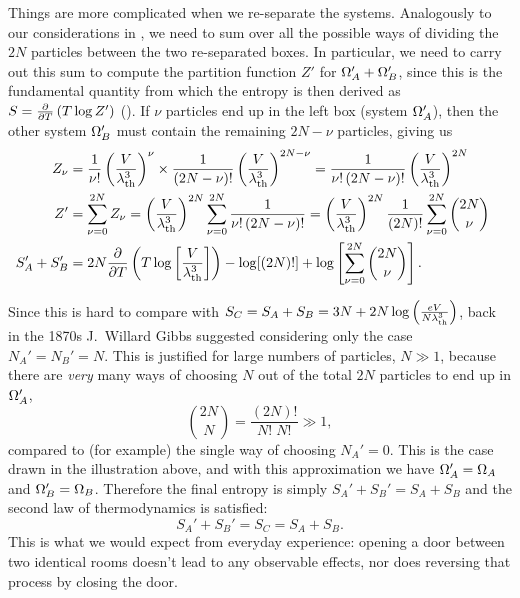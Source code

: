 Things are more complicated when we re-separate the systems.
Analogously to our considerations in , we need to sum over all the possible ways of dividing the $2N$ particles between the two re-separated boxes.
In particular, we need to carry out this sum to compute the partition function $Z'$ for $\Omega_A' + \Omega_B'$, since this is the fundamental quantity from which the entropy is then derived as $S = \frac{\partial }{\partial T}\left(T\log Z'\right)$ ().
If $\nu$ particles end up in the left box (system $\Omega_A'$), then the other system $\Omega_B'$ must contain the remaining $2N - \nu$ particles, giving us
\begin{align}
  Z_{\nu}     & = \frac{1}{\nu!} \left(\frac{V}{\lambda_{\mathrm{th}}^3}\right)^{\nu} \times \frac{1}{(2N - \nu)!} \left(\frac{V}{\lambda_{\mathrm{th}}^3}\right)^{2N - \nu} = \frac{1}{\nu! \, (2N - \nu)!} \left(\frac{V}{\lambda_{\mathrm{th}}^3}\right)^{2N} \cr
  Z'          & = \sum_{\nu = 0}^{2N} Z_{\nu} = \left(\frac{V}{\lambda_{\mathrm{th}}^3}\right)^{2N} \sum_{\nu = 0}^{2N} \frac{1}{\nu! \, (2N - \nu)!} = \left(\frac{V}{\lambda_{\mathrm{th}}^3}\right)^{2N} \frac{1}{(2N)!} \sum_{\nu = 0}^{2N} \binom{2N}{\nu} \cr
  S_A' + S_B' & = 2N \frac{\partial }{\partial T}\left(T\log \left[\frac{V}{\lambda_{\mathrm{th}}^3}\right]\right) - \log[(2N)!] + \log\left[ \sum_{\nu = 0}^{2N} \binom{2N}{\nu} \right]. \label{eq:mixing_full}
\end{align}

Since this is hard to compare with $S_C = S_A + S_B = 3N + 2N \log\left(\frac{eV}{N\lambda_{\mathrm{th}}^3}\right)$, back in the 1870s J.\ Willard Gibbs suggested considering only the case $N_A' = N_B' = N$.
This is justified for large numbers of particles, $N \gg 1$, because there are \textit{very} many ways of choosing $N$ out of the total $2N$ particles to end up in $\Omega_A'$,
\begin{equation}
  \label{eq:mixing_factorial}
  \binom{2N}{N} = \frac{(2N)!}{N! \; N!} \gg 1,
\end{equation}
compared to (for example) the single way of choosing $N_A' = 0$.
This is the case drawn in the illustration above, and with this approximation we have $\Omega_A' = \Omega_A$ and $\Omega_B' = \Omega_B$.
Therefore the final entropy is simply $S_A' + S_B' = S_A + S_B$ and the second law of thermodynamics is satisfied:
\begin{equation*}
  S_A' + S_B' = S_C = S_A + S_B.
\end{equation*}
This is what we would expect from everyday experience: opening a door between two identical rooms doesn't lead to any observable effects, nor does reversing that process by closing the door.

